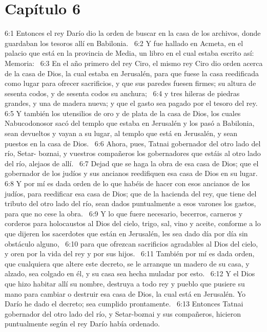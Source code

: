 \section*{Capítulo 6}

6:1 Entonces el rey Darío dio la orden de buscar en la casa de los archivos, donde guardaban los tesoros allí en Babilonia.  
6:2 Y fue hallado en Acmeta, en el palacio que está en la provincia de Media, un libro en el cual estaba escrito así: Memoria:  
6:3 En el año primero del rey Ciro, el mismo rey Ciro dio orden acerca de la casa de Dios, la cual estaba en Jerusalén, para que fuese la casa reedificada como lugar para ofrecer sacrificios, y que sus paredes fuesen firmes; su altura de sesenta codos, y de sesenta codos su anchura;  
6:4 y tres hileras de piedras grandes, y una de madera nueva; y que el gasto sea pagado por el tesoro del rey.  
6:5 Y también los utensilios de oro y de plata de la casa de Dios, los cuales Nabucodonosor sacó del templo que estaba en Jerusalén y los pasó a Babilonia, sean devueltos y vayan a su lugar, al templo que está en Jerusalén, y sean puestos en la casa de Dios.  
6:6 Ahora, pues, Tatnai gobernador del otro lado del río, Setar- boznai, y vuestros compañeros los gobernadores que estáis al otro lado del río, alejaos de allí.  
6:7 Dejad que se haga la obra de esa casa de Dios; que el gobernador de los judíos y sus ancianos reedifiquen esa casa de Dios en su lugar.  
6:8 Y por mí es dada orden de lo que habéis de hacer con esos ancianos de los judíos, para reedificar esa casa de Dios; que de la hacienda del rey, que tiene del tributo del otro lado del río, sean dados puntualmente a esos varones los gastos, para que no cese la obra.  
6:9 Y lo que fuere necesario, becerros, carneros y corderos para holocaustos al Dios del cielo, trigo, sal, vino y aceite, conforme a lo que dijeren los sacerdotes que están en Jerusalén, les sea dado día por día sin obstáculo alguno,  
6:10 para que ofrezcan sacrificios agradables al Dios del cielo, y oren por la vida del rey y por sus hijos.  
6:11 También por mí es dada orden, que cualquiera que altere este decreto, se le arranque un madero de su casa, y alzado, sea colgado en él, y su casa sea hecha muladar por esto.  
6:12 Y el Dios que hizo habitar allí su nombre, destruya a todo rey y pueblo que pusiere su mano para cambiar o destruir esa casa de Dios, la cual está en Jerusalén. Yo Darío he dado el decreto; sea cumplido prontamente.  
6:13 Entonces Tatnai gobernador del otro lado del río, y Setar-boznai y sus compañeros, hicieron puntualmente según el rey Darío había ordenado.  
